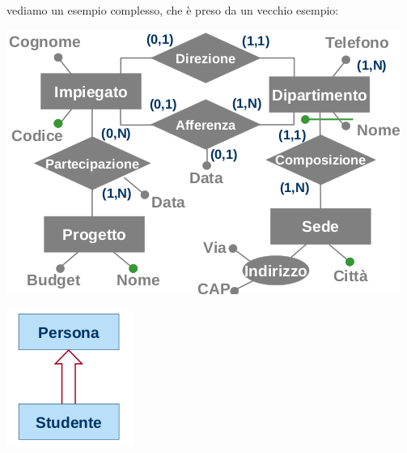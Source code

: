 \documentclass[a4paper,12pt, oneside]{book}
\begin{document}
vediamo un esempio complesso, che è preso da un vecchio esempio:
\begin{center}
\includegraphics[scale=0.8]{img/er14.png}
\end{center}

\begin{center}
\includegraphics[scale=0.8]{img/isa.png}
\end{center}
\end{document}
